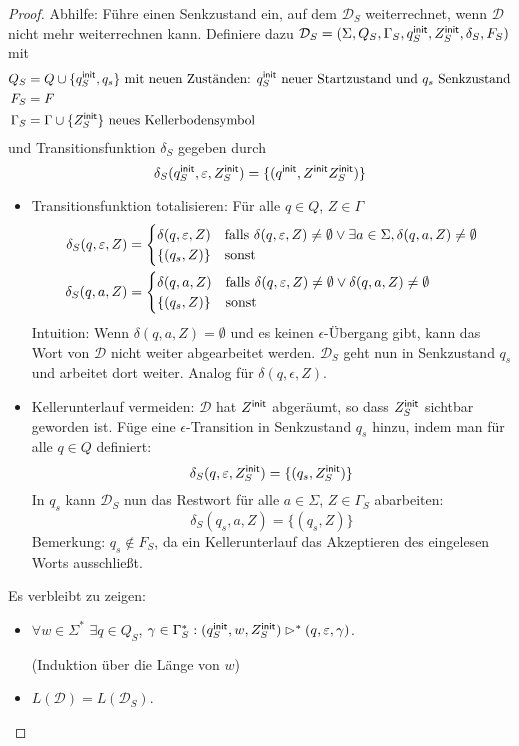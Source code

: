 \begin{proof}
  Abhilfe: Führe einen Senkzustand ein, auf dem $\mathcal{D}_S$ weiterrechnet, wenn $\mathcal{D}$ nicht mehr weiterrechnen kann. 
  Definiere dazu $\mathcal{D}_S = (\Sigma, Q_S, \Gamma_S, q^\mathsf{init}_S, Z^\mathsf{init}_S, \delta_S, F_S)$ mit
  \begin{align*}
  Q_S &= Q \cup \{q^\mathsf{init}_S, q_s\} \text{ mit neuen Zuständen: $q^\mathsf{init}_S$ neuer Startzustand und $q_s$ Senkzustand} \\
  F_S &= F \\
  \Gamma_S &= \Gamma \cup \{Z^\mathsf{init}_S\} \text{ neues Kellerbodensymbol}
  \end{align*}
  und Transitionsfunktion $\delta_S$ gegeben durch
  \[\delta_S (q^\mathsf{init}_S, \varepsilon, Z^\mathsf{init}_S) = \{ (q^\mathsf{init}, Z^\mathsf{init}Z^\mathsf{init}_S) \} \]
  \begin{itemize}
  \item Transitionsfunktion totalisieren: Für alle $q\in Q$, $Z \in \Gamma$
    \begin{align*}
      \delta_S (q, \varepsilon, Z) &=
      \begin{cases}
        \delta (q, \varepsilon, Z) & \text{falls
        }\delta (q, \varepsilon, Z)\ne\emptyset\vee\exists a\in\Sigma, \delta (q, a, Z)\ne \emptyset \\
        \{ (q_s, Z) \} & \text{sonst}
      \end{cases} \\
      \delta_S (q, a, Z) &=
      \begin{cases}
        \delta (q, a, Z) & \text{falls }\delta (q, \varepsilon, Z)\ne\emptyset\vee\delta (q,
        a, Z) \ne \emptyset \\
        \{ (q_s, Z) \} & \text{sonst}
      \end{cases}
    \end{align*}
    Intuition: Wenn $\delta(q, a, Z) = \emptyset$ und es keinen $\epsilon$-Übergang gibt, kann das Wort von $\mathcal{D}$ nicht weiter abgearbeitet werden. $\mathcal{D}_S$ geht nun in Senkzustand $q_s$ und arbeitet dort weiter. Analog für $\delta(q, \epsilon, Z)$.
  \item Kellerunterlauf vermeiden: $\mathcal{D}$ hat $Z^\mathsf{init}$ abgeräumt, so dass $Z^\mathsf{init}_S$
    sichtbar geworden ist. Füge eine $\epsilon$-Transition in
     Senkzustand $q_s$ hinzu, indem man für alle $q\in Q$ definiert:
    \[\delta_S (q, \varepsilon, Z^\mathsf{init}_S) = \{ (q_s, Z^\mathsf{init}_S) \} \]
  In $q_s$ kann $\mathcal{D}_S$ nun das Restwort für alle $a\in\Sigma$, $Z\in \Gamma_S$ abarbeiten:
    \[\delta_S (q_s, a, Z) = \{ (q_s, Z) \}\]
    Bemerkung: $q_s \not \in F_S$, da ein Kellerunterlauf
    das Akzeptieren des eingelesen Worts ausschließt.
  \end{itemize}

  Es verbleibt zu zeigen:
  \begin{itemize}
   \item $\forall w\in \Sigma^*$ $\exists q\in Q_S$,
  $\gamma\in\Gamma_S^*: (q^\mathsf{init}_S, w, Z^\mathsf{init}_S) \rhd^* (q,
  \varepsilon, \gamma)$.
  
  (Induktion über die Länge von $w$)
  \item $L (\mathcal{D}) = L (\mathcal{D}_S)$.
  \qedhere
  \end{itemize}
\end{proof}

